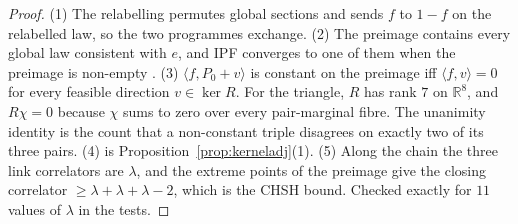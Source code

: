 \documentclass[11pt]{article}
\theoremstyle{definition}
\theoremstyle{remark}
\begin{document}
\begin{proof}
(1) The relabelling permutes global sections and sends $f$ to $1-f$ on the relabelled law, so the two programmes exchange. (2) The preimage contains every global law consistent with $e$, and IPF converges to one of them when the preimage is non-empty \cite{csiszar}. (3) $\langle f,P_0+v\rangle$ is constant on the preimage iff $\langle f,v\rangle=0$ for every feasible direction $v\in\ker R$. For the triangle, $R$ has rank $7$ on $\mathbb R^8$, and $R\chi=0$ because $\chi$ sums to zero over every pair-marginal fibre. The unanimity identity is the count that a non-constant triple disagrees on exactly two of its three pairs. (4) is Proposition~\ref{prop:kerneladj}(1). (5) Along the chain the three link correlators are $\lambda$, and the extreme points of the preimage give the closing correlator $\ge\lambda+\lambda+\lambda-2$, which is the CHSH bound. Checked exactly for $11$ values of $\lambda$ in the tests.
\end{proof}
\end{document}
